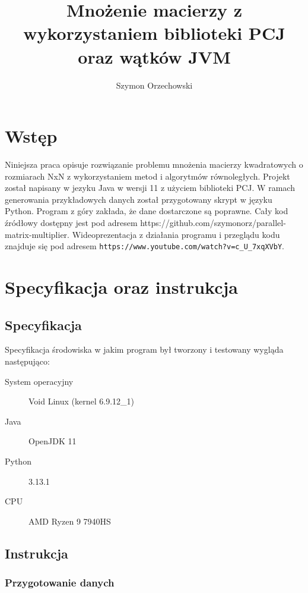 \documentclass[11pt]{article}
\title{Mnożenie macierzy z wykorzystaniem biblioteki PCJ oraz wątków JVM}
\author{Szymon Orzechowski}
\date{}
\begin{document}
    \maketitle

    \clearpage

    \tableofcontents

    \clearpage

    \section{Wstęp}

    Niniejsza praca opisuje rozwiązanie problemu mnożenia macierzy kwadratowych o rozmiarach NxN z wykorzystaniem metod i algorytmów równoległych.
    Projekt został napisany w jezyku Java w wersji 11 z użyciem biblioteki PCJ. W ramach generowania przykładowych danych został przygotowany skrypt
    w języku Python. Program z góry zakłada, że dane dostarczone są poprawne.
    Cały kod źródłowy dostępny jest pod adresem https://github.com/szymonorz/parallel-matrix-multiplier.
    Wideoprezentacja z działania programu i przeglądu kodu znajduje się pod adresem \verb|https://www.youtube.com/watch?v=c_U_7xqXVbY|.
    
    \section{Specyfikacja oraz instrukcja}

    \subsection{Specyfikacja}
    Specyfikacja środowiska w jakim program był tworzony i testowany wygląda następująco:

    \begin{description}
        \item[System operacyjny] Void Linux (kernel 6.9.12\_1)
        \item[Java] OpenJDK 11
        \item[Python] 3.13.1
        \item[CPU] AMD Ryzen 9 7940HS
    \end{description}

    \subsection{Instrukcja}
    \subsubsection{Przygotowanie danych}
\end{document}
